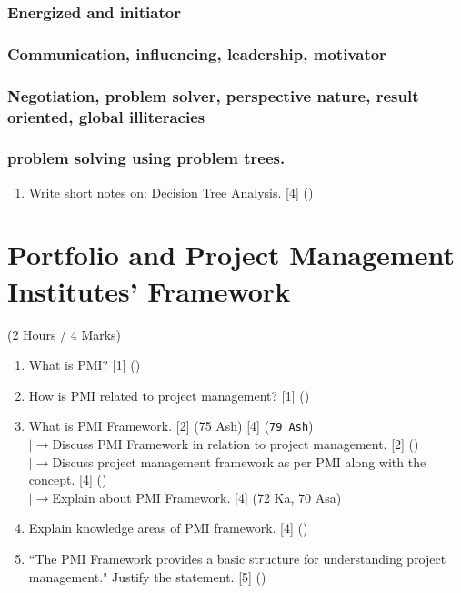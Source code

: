\documentclass[12pt]{article}
\newcommand{\lb}{\\$\left|\rightarrow\right.$}
\begin{document}
    \subsubsection{Energized and initiator}
    \subsubsection{Communication, influencing, leadership, motivator}
    \subsubsection{Negotiation, problem solver, perspective nature, result oriented, global illiteracies}
    \subsubsection{problem solving using problem trees.}
      \begin{enumerate}
        \item Write short notes on: Decision Tree Analysis. \hfill [4] ()
      \end{enumerate}

\pagebreak

\section{Portfolio and Project Management Institutes' Framework}
  \begin{center}(2 Hours / 4 Marks)\end{center}

  \begin{enumerate}
    \item What is PMI? \hfill [1] ()

    \item How is PMI related to project management? \hfill [1] ()

    \item What is PMI Framework. \hfill [2] (75 Ash) [4] (\texttt{79 Ash})
      \lb Discuss PMI Framework in relation to project management. \hfill [2] ()
      \lb Discuss project management framework as per PMI along with the concept. \hfill [4] ()
      \lb Explain about PMI Framework. \hfill [4] (72 Ka, 70 Asa)

    \item Explain knowledge areas of PMI framework. \hfill [4] ()

    \item ``The PMI Framework provides a basic structure for understanding project management." Justify the statement. \hfill [5] ()
  \end{enumerate}
\end{document}

